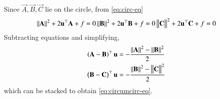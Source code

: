 \begin{enumerate}[label=\thesubsection.\arabic*.,ref=\thesubsection.\theenumi]
	\solution Since $\vec{A},\vec{B}, \vec{C}$ lie on the circle, from 
	\eqref{eq:circ-eq}
\begin{align}
	\left\lVert\mathbf{A}\right\rVert^2 + 2 \mathbf{u}^{\top}\mathbf{A} + f = 0
	\left\lVert\mathbf{B}\right\rVert^2 + 2 \mathbf{u}^{\top}\mathbf{B} + f = 0
	\left\lVert\mathbf{C}\right\rVert^2 + 2 \mathbf{u}^{\top}\mathbf{C} + f = 0
\end{align}
Subtracting equations and simplifying,
\begin{align}
			\left(\mathbf{A}-\mathbf{B}\right)^{\top} \mathbf{u} &= -\frac{\left\lVert\mathbf{A}\right\rVert^2 -\left\lVert\mathbf{B}\right\rVert^2}{2}\\
			\left(\mathbf{B}-\mathbf{C}\right)^{\top} \mathbf{u} &= -\frac{\left\lVert\mathbf{B}\right\rVert^2 -\left\lVert\mathbf{C}\right\rVert^2}{2}
\end{align}
which can be stacked to obtain 
	\eqref{eq:circumcirc-eq}.
\end{enumerate}
